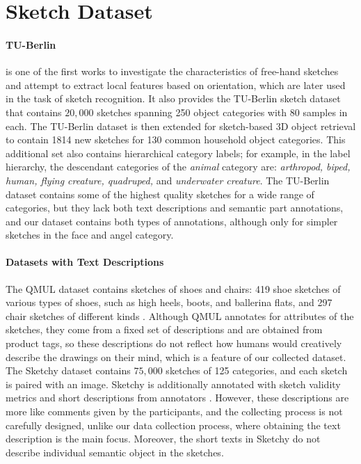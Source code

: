 \section{Sketch Dataset} \label{related.sketch.datasets}

\paragraph{TU-Berlin}
\citet{eitz2012hdhso} is one of the first works to investigate the characteristics of free-hand sketches and attempt to extract local features based on orientation, which are later used in the task of sketch recognition. 
It also provides the TU-Berlin sketch dataset that contains $20,000$ sketches spanning 250 object categories with 80 samples in each. 
The TU-Berlin dataset is then extended for sketch-based 3D object retrieval to contain 1814 new sketches for 130 common household object categories. This additional set also contains hierarchical category labels; for example, in the label hierarchy, the descendant categories of the \textit{animal} category are: \textit{arthropod, biped, human, flying creature, quadruped,} and \textit{underwater creature}. 
The TU-Berlin dataset contains some of the highest quality sketches for a wide range of categories, but they lack both text descriptions and semantic part annotations, and our dataset contains both types of annotations, although only for simpler sketches in the face and angel category.    

\paragraph{Datasets with Text Descriptions}
The QMUL dataset contains sketches of shoes and chairs: 419 shoe sketches of various types of shoes, such as high heels, boots, and ballerina flats, and 297 chair sketches of different kinds \citep{qmulDataset}. 
Although QMUL annotates for attributes of the sketches, they come from a fixed set of descriptions and are obtained from product tags, so these descriptions do not reflect how humans would creatively describe the drawings on their mind, which is a feature of our collected dataset.    
The Sketchy dataset contains $75,000$ sketches of 125 categories, and each sketch is paired with an image.
Sketchy is additionally annotated with sketch validity metrics and short descriptions from annotators \citep{sketchyDataset}. However, these descriptions are more like comments given by the participants, and the collecting process is not carefully designed, unlike our data collection process, where obtaining the text description is the main focus. 
Moreover, the short texts in Sketchy do not describe individual semantic object in the sketches.     

